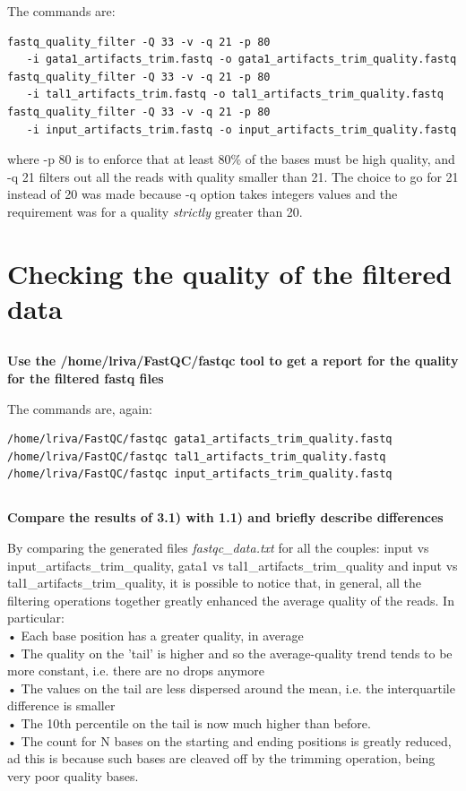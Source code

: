 \documentclass[12pt, a4paper]{article}
\begin{document}
The commands are:

\begin{verbatim}
fastq_quality_filter -Q 33 -v -q 21 -p 80
   -i gata1_artifacts_trim.fastq -o gata1_artifacts_trim_quality.fastq
fastq_quality_filter -Q 33 -v -q 21 -p 80
   -i tal1_artifacts_trim.fastq -o tal1_artifacts_trim_quality.fastq
fastq_quality_filter -Q 33 -v -q 21 -p 80
   -i input_artifacts_trim.fastq -o input_artifacts_trim_quality.fastq
\end{verbatim}

where -p 80 is to enforce that at least 80\% of the bases must be high quality, and -q 21 filters out all the reads with quality smaller than 21. The choice to go for 21 instead of 20 was made because -q option takes integers values and the requirement was for a quality \textit{strictly} greater than 20.

\section{Checking the quality of the filtered data}

\subsection{}
\textbf{Use the /home/lriva/FastQC/fastqc tool to get a report for the quality for the filtered fastq files}

The commands are, again:

\begin{verbatim}
/home/lriva/FastQC/fastqc gata1_artifacts_trim_quality.fastq
/home/lriva/FastQC/fastqc tal1_artifacts_trim_quality.fastq
/home/lriva/FastQC/fastqc input_artifacts_trim_quality.fastq
\end{verbatim}

\subsection{}
\textbf{Compare the results of 3.1) with 1.1) and briefly describe differences}

By comparing the generated files \textit{fastqc\_data.txt} for all the couples: input vs input\_artifacts\_trim\_quality, gata1 vs tal1\_artifacts\_trim\_quality and input vs tal1\_artifacts\_trim\_quality, it is possible to notice that, in general, all the filtering operations together greatly enhanced the average quality of the reads. In particular:\\
• Each base position has a greater quality, in average\\
• The quality on the 'tail' is higher and so the average-quality trend tends to be more constant, i.e. there are no drops anymore\\
• The values on the tail are less dispersed around the mean, i.e. the interquartile difference is smaller\\
• The 10th percentile on the tail is now much higher than before.\\
• The count for N bases on the starting and ending positions is greatly reduced, ad this is because such bases are cleaved off by the trimming operation, being very poor quality bases.\\
\end{document}
